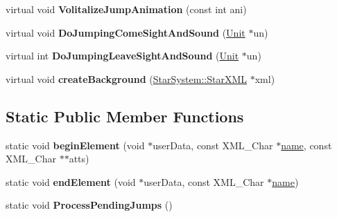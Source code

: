 \begin{DoxyCompactItemize}
\item 
virtual void {\bfseries Volitalize\+Jump\+Animation} (const int ani)\hypertarget{classStarSystem_a5c6c3b5111432b334f5ffd71aee7c996}{}\label{classStarSystem_a5c6c3b5111432b334f5ffd71aee7c996}

\item 
virtual void {\bfseries Do\+Jumping\+Come\+Sight\+And\+Sound} (\hyperlink{classUnit}{Unit} $\ast$un)\hypertarget{classStarSystem_a0cd3bfbf6ba8ce511ea78840822139ce}{}\label{classStarSystem_a0cd3bfbf6ba8ce511ea78840822139ce}

\item 
virtual int {\bfseries Do\+Jumping\+Leave\+Sight\+And\+Sound} (\hyperlink{classUnit}{Unit} $\ast$un)\hypertarget{classStarSystem_a3b09ec4ea51ed3cff5d24894ed58d007}{}\label{classStarSystem_a3b09ec4ea51ed3cff5d24894ed58d007}

\item 
virtual void {\bfseries create\+Background} (\hyperlink{structStarSystem_1_1StarXML}{Star\+System\+::\+Star\+X\+ML} $\ast$xml)\hypertarget{classStarSystem_aff68d900a9d1a0d015d13b74721a4453}{}\label{classStarSystem_aff68d900a9d1a0d015d13b74721a4453}

\end{DoxyCompactItemize}
\subsection*{Static Public Member Functions}
\begin{DoxyCompactItemize}
\item 
static void {\bfseries begin\+Element} (void $\ast$user\+Data, const X\+M\+L\+\_\+\+Char $\ast$\hyperlink{classStarSystem_a1ca90e6ba69744ed55bb6009fd000c2b}{name}, const X\+M\+L\+\_\+\+Char $\ast$$\ast$atts)\hypertarget{classStarSystem_afd92fac1f17bcb28c1ce10d6b63cebde}{}\label{classStarSystem_afd92fac1f17bcb28c1ce10d6b63cebde}

\item 
static void {\bfseries end\+Element} (void $\ast$user\+Data, const X\+M\+L\+\_\+\+Char $\ast$\hyperlink{classStarSystem_a1ca90e6ba69744ed55bb6009fd000c2b}{name})\hypertarget{classStarSystem_ae3d19c7f1d26785e4be8e0425f1cb297}{}\label{classStarSystem_ae3d19c7f1d26785e4be8e0425f1cb297}

\item 
static void {\bfseries Process\+Pending\+Jumps} ()\hypertarget{classStarSystem_a469764650ae2c9ca9b2edf98a1beec66}{}\label{classStarSystem_a469764650ae2c9ca9b2edf98a1beec66}

\end{DoxyCompactItemize}
